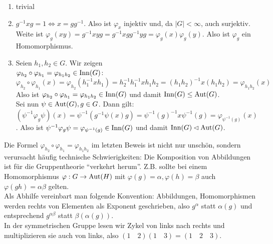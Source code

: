 \begin{beweis}  \spspace%
 \begin{enumerate}
  \item trivial
  \item $g^{-1}xg = 1 \Leftrightarrow x=gg^{-1}$. Also ist $\varphi_x$ injektiv und, da $|G|<\infty$, auch surjektiv.
    Weite ist $\varphi_g(xy)=g^{-1}xyg=g^{-1}xgg^{-1}yg=\varphi_g(x)\varphi_g(y)$. Also ist $\varphi_g$ ein Homomorphismus.
  \item Seien $h_1,h_2 \in G$. Wir zeigen\\ $\varphi_{h_{2}}\circ\varphi_{h_{1}}=\\\varphi_{h_1h_2}\in \operatorname{Inn}(G)$:\\
  $\varphi_{h_2}\circ\varphi_{h_1}(x)=\varphi_{h_2}(h_1^{-1}xh_1)=h_2^{-1}h_1^{-1}xh_1h_2=(h_1h_2)^{-1}x(h_1h_2)=\varphi_{h_1h_2}(x)$ Also ist $\varphi_{h_2}\circ\varphi_{h_1}=\varphi_{h_1h_2}\in \operatorname{Inn}(G)$ und damit $\operatorname{Inn}(G)\leq\operatorname{Aut}(G)$.\\
  Sei nun $\psi\in\operatorname{Aut}(G), g \in G$. Dann gilt: $(\psi^{-1}\varphi_g\psi)(x)=\psi^{-1}(g^{-1}\psi(x)g)=\psi^{-1}(g)^{-1}x\psi^{-1}(g)=\varphi_{\psi^{-1}(g)}(x)$. Also ist $\psi^{-1}\varphi_g\psi=\varphi_{\psi^{-1}(g)}\in\operatorname{Inn}(G)$ und damit $\operatorname{Inn}(G)\lhd\operatorname{Aut}(G)$.

 \end{enumerate}

\end{beweis}




\begin{bemerkung}
 Die Formel $\varphi_{h_2}\circ\varphi_{h_1}=\varphi_{h_1h_2}$ im letzten Beweis ist nicht nur unsch\"on, sondern verursacht h\"aufig technische Schwierigkeiten: Die Komposition von Abbildungen ist f\"ur die Gruppentheorie ``verkehrt herum''. Z.B. sollte bei einem Homomorphismus $\varphi:G\to\operatorname{Aut}(H)$ mit $\varphi(g)=\alpha, \varphi(h)=\beta$ auch $\varphi(gh)=\alpha\beta$ gelten.\\
 Als Abhilfe vereinbart man folgende Konvention: Abbildungen, Homomorphismen werden rechts von Elementen als Exponent geschrieben, also $g^\alpha$ statt $\alpha(g)$ und entsprechend $g^{\alpha\beta}$ statt $\beta(\alpha(g))$.\\
 In der symmetrischen Gruppe lesen wir Zykel von links nach rechts und multiplizieren sie auch von links, also $(1\quad 2)(1\quad 3)=(1\quad 2\quad 3)$.
\end{bemerkung}

